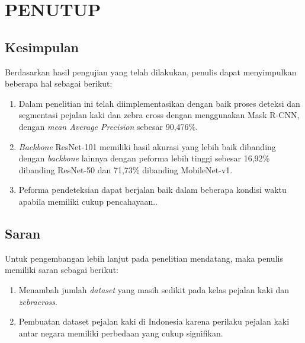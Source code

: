 \chapter{PENUTUP}
\label{chap:penutup}


\section{Kesimpulan}
\label{sec:kesimpulan}

Berdasarkan hasil pengujian yang telah dilakukan, penulis dapat menyimpulkan beberapa hal sebagai berikut:

\begin{enumerate}[nolistsep]

  \item Dalam penelitian ini telah diimplementasikan dengan baik proses deteksi dan segmentasi pejalan kaki dan zebra cross dengan menggunakan Mask R-CNN, dengan \textit{mean Average Precision} sebesar 90,476\%.
  \item \textit{Backbone} ResNet-101 memiliki hasil akurasi yang lebih baik dibanding dengan \textit{backbone} lainnya dengan peforma lebih tinggi sebesar 16,92\% dibanding ResNet-50 dan 71,73\% dibanding MobileNet-v1. 
  \item Peforma pendeteksian dapat berjalan baik dalam beberapa kondisi waktu apabila memiliki cukup pencahayaan..
  
\end{enumerate}

\section{Saran}
\label{sec:saran}

Untuk pengembangan lebih lanjut pada penelitian mendatang, maka penulis memiliki saran sebagai berikut:

\begin{enumerate}[nolistsep]

  \item Menambah jumlah \textit{dataset} yang masih sedikit pada kelas pejalan kaki dan \textit{zebracross}.

  \item Pembuatan dataset pejalan kaki di Indonesia karena perilaku pejalan kaki antar negara memiliki perbedaan yang cukup signifikan.

\end{enumerate}
